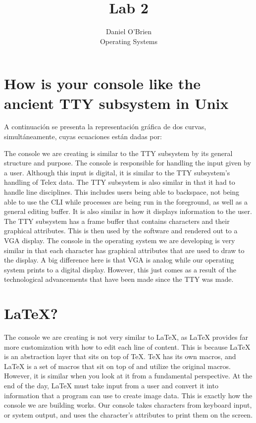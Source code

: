 \documentclass[12pt]{article}
\begin{document}
 

\title{Lab 2}
\author{Daniel O'Brien\\ 
Operating Systems}

\maketitle
\section{How is your console like the ancient TTY subsystem in Unix}
A continuación se presenta la representación gráfica de dos curvas, simultáneamente, cuyas ecuaciones están dadas por:

The console we are creating is similar to the TTY subsystem by its general structure and purpose. The console is responsible for handling the input given by a user. Although this input is digital, it is similar to the TTY subsystem’s handling of Telex data.  The TTY subsystem is also similar in that it had to handle line disciplines. This includes users being able to backspace, not being able to use the CLI while processes are being run in the foreground, as well as a general editing buffer. It is also similar in how it displays information to the user. The TTY subsystem has a frame buffer that contains characters and their graphical attributes. This is then used by the software and rendered out to a VGA display. The console in the operating system we are developing is very similar in that each character has graphical attributes that are used to draw to the display. A big difference here is that VGA is analog while our operating system prints to a digital display. However, this just comes as a result of the technological advancements that have been made since the TTY was made. 


\section{LaTeX?}

The console we are creating is not very similar to LaTeX, as LaTeX provides far more customization with how to edit each line of content. This is because LaTeX is an abstraction layer that sits on top of TeX. TeX has its own macros, and LaTeX is a set of macros that sit on top of and utilize the original macros. However, it is similar when you look at it from a fundamental perspective. At the end of the day, LaTeX must take input from a user and convert it into information that a program can use to create image data. This is exactly how the console we are building works. Our console takes characters from keyboard input, or system output, and uses the character’s attributes to print them on the screen. 
\end{document}
